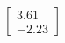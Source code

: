 \documentclass[preview]{standalone}
\begin{document}
\begin{align*}
\begin{bmatrix} 3.61 \\ -2.23 \end{bmatrix}
\end{align*}
\end{document}
